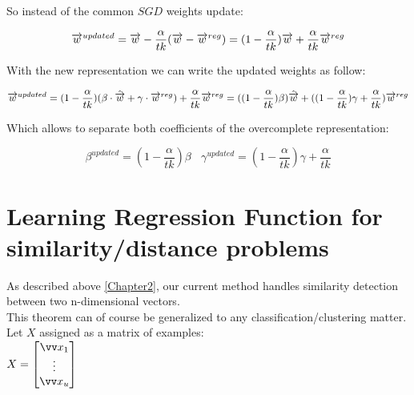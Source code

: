 So instead of the common $SGD$ weights update:

\begin{equation}
\\ \overrightarrow{w}^{updated} = \overrightarrow{w} - \frac{\alpha}{tk}(
\overrightarrow{w} - \overrightarrow{w}^{reg})
\\ \\= (1-\frac{\alpha}{tk})\overrightarrow{w} + \frac{\alpha}{tk}\overrightarrow{w}^{reg}
\end{equation}

With the new representation we can write the updated weights as follow:

\begin{equation}
\\ \overrightarrow{w}^{updated} = (1-\frac{\alpha}{tk})(\beta \cdot \hat{\overrightarrow{w}} + \gamma \cdot \overrightarrow{w}^{reg}) +  \frac{\alpha}{tk}\overrightarrow{w}^{reg}
\\\\= ((1-\frac{\alpha}{tk})\beta)\hat{\overrightarrow{w}} + 
((1-\frac{\alpha}{tk})\gamma
+\frac{\alpha}{tk})\overrightarrow{w}^{reg}
\end{equation}

Which allows to separate both coefficients of the overcomplete representation:

\begin{equation}
\beta^{updated} = (1-\frac{\alpha}{tk})\beta \:\:\:\: \gamma^{updated} = (1-\frac{\alpha}{tk})\gamma+\frac{\alpha}{tk}
\end{equation}

\vskip20pt









\section{Learning Regression Function for similarity/distance problems}
\label{learn_regression}
As described above \ref{Chapter2}, our current method handles similarity detection between two n-dimensional vectors.\\ This theorem can of course be generalized to any classification/clustering matter.
\\

Let $X$ assigned as a matrix of examples:\\ 

$ \examplesmatrix $

